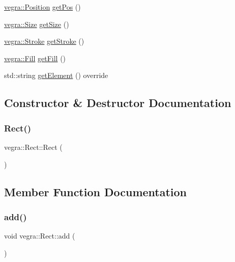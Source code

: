 \begin{DoxyCompactItemize}
\mbox{\hyperlink{structvegra_1_1Position}{vegra\+::\+Position}} \mbox{\hyperlink{structvegra_1_1Rect_a78df3821c00d24877cd16e5d356e2d3a}{get\+Pos}} ()
\item 
\mbox{\hyperlink{structvegra_1_1Size}{vegra\+::\+Size}} \mbox{\hyperlink{structvegra_1_1Rect_a509bc44c11ff4c5da09b9f0a8f989f3e}{get\+Size}} ()
\item 
\mbox{\hyperlink{structvegra_1_1Stroke}{vegra\+::\+Stroke}} \mbox{\hyperlink{structvegra_1_1Rect_aa6015029c78e89030e2e125e53be7e31}{get\+Stroke}} ()
\item 
\mbox{\hyperlink{structvegra_1_1Fill}{vegra\+::\+Fill}} \mbox{\hyperlink{structvegra_1_1Rect_a3abeedcf01ddec54812aa4c0f21c1877}{get\+Fill}} ()
\item 
std\+::string \mbox{\hyperlink{structvegra_1_1Rect_a914ba572d7bda0dcb40b6f112d959f04}{get\+Element}} () override
\end{DoxyCompactItemize}


\subsection{Constructor \& Destructor Documentation}
\mbox{\label{structvegra_1_1Rect_a5f7d578540b861188333858882d8fc09}} 
\subsubsection{\texorpdfstring{Rect()}{Rect()}}
{\footnotesize\ttfamily vegra\+::\+Rect\+::\+Rect (\begin{DoxyParamCaption}{ }\end{DoxyParamCaption})\hspace{0.3cm}{\ttfamily [inline]}}



\subsection{Member Function Documentation}
\mbox{\label{structvegra_1_1Rect_a58f3d61bd592c6344d319da7eb7cee5c}} 
\subsubsection{\texorpdfstring{add()}{add()}\hspace{0.1cm}{\footnotesize\ttfamily [1/3]}}
{\footnotesize\ttfamily void vegra\+::\+Rect\+::add (\begin{DoxyParamCaption}{ }\end{DoxyParamCaption})\hspace{0.3cm}{\ttfamily [inline]}}

